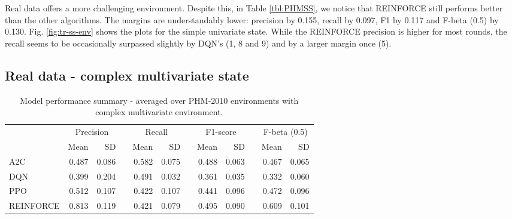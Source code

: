 \documentclass[a4paper, 12pt]{article}
\newcommand{\rowspace}[1]{\renewcommand{\arraystretch}{#1}}
\begin{document}
Real data offers a more challenging environment. Despite this, in Table \ref{tbl:PHMSS}, we notice that REINFORCE  still performs better than the other algorithms. The margins are understandably lower: precision by 0.155, recall by 0.097, F1 by 0.117 and F-beta (0.5) by 0.130. Fig. \ref{fig:tr-ss-env} shows the plots for the simple univariate state. While the REINFORCE precision is higher for most rounds, the recall seems to be occasionally surpassed slightly by DQN's (1, 8 and 9) and by a larger margin once (5).

\subsection{Real data - complex multivariate state}
\begin{table}[!htb]\centering
	\sffamily
	\rowspace{1.3}
	\begin{tabular}{@{}l rr c rr c rr c rr@{}}
		\arrayrulecolor{black!40}\toprule
		& \multicolumn{2}{c}{Precision} & \phantom{i} & \multicolumn{2}{c}{Recall} & \phantom{i} & \multicolumn{2}{c}{F1-score} & \phantom{i} & \multicolumn{2}{c}{F-beta (0.5)} \\
		\cmidrule{2-3} \cmidrule{5-6} \cmidrule{8-9} \cmidrule{11-12} 
		
		&Mean &SD & &Mean &SD & &Mean &SD& &Mean & SD\\ \midrule
		A2C & 0.487 & 0.086 & &\textcolor{dblue}{0.582} & 0.075 & & 0.488 & 0.063 & &0.467 &0.065 \\
		DQN & 0.399 & 0.204 & &0.491 & 0.032 & & 0.361 & 0.035 & &0.332 &0.060 \\
		PPO & 0.512 & 0.107 & &0.422 & 0.107 & & 0.441 & 0.096 & &0.472 &0.096 \\
		REINFORCE & \textcolor{dblue}{0.813} & 0.119 & &0.421 & 0.079 & & \textcolor{dblue}{0.495} & 0.090 & &\textcolor{dblue}{0.609} &0.101 \\
		\bottomrule
	\end{tabular}
	\caption{Model performance summary - averaged over PHM-2010 environments with complex multivariate environment.}
	\label{tbl:PHMMS}
\end{table}
\end{document}
